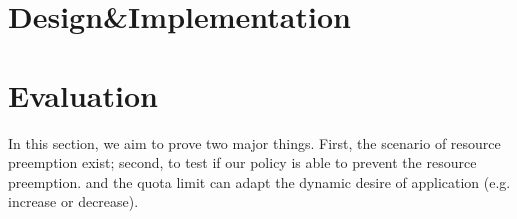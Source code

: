 \documentclass[10pt, conference,compsoc]{IEEEtran}
\begin{document}




\section{Design\&Implementation}

\section{Evaluation}

In this section, we aim to prove two major things. First, the scenario of resource preemption exist; second, to test if our policy is able to prevent the resource preemption.
and the quota limit can adapt the dynamic desire of application (e.g. increase or decrease).
\end{document}
